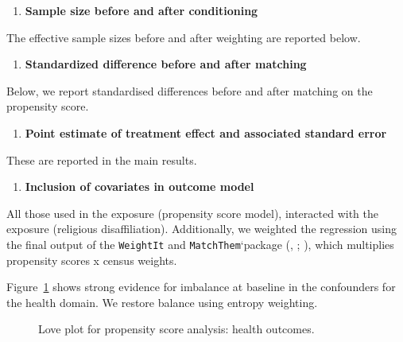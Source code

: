 \documentclass[
  singlecolumn,
  9pt]{article}
\providecommand{\tightlist}{%
  \setlength{\itemsep}{0pt}\setlength{\parskip}{0pt}}\usepackage{longtable,booktabs,array}
\begin{document}
\begin{enumerate}
\def\labelenumi{\arabic{enumi}.}
\setcounter{enumi}{7}
\tightlist
\item
  \textbf{Sample size before and after conditioning}
\end{enumerate}

The effective sample sizes before and after weighting are reported
below.

\begin{enumerate}
\def\labelenumi{\arabic{enumi}.}
\setcounter{enumi}{8}
\tightlist
\item
  \textbf{Standardized difference before and after matching}
\end{enumerate}

Below, we report standardised differences before and after matching on
the propensity score.

\begin{enumerate}
\def\labelenumi{\arabic{enumi}.}
\setcounter{enumi}{9}
\tightlist
\item
  \textbf{Point estimate of treatment effect and associated standard
  error}
\end{enumerate}

These are reported in the main results.

\begin{enumerate}
\def\labelenumi{\arabic{enumi}.}
\setcounter{enumi}{10}
\tightlist
\item
  \textbf{Inclusion of covariates in outcome model}
\end{enumerate}

All those used in the exposure (propensity score model), interacted with
the exposure (religious disaffiliation). Additionally, we weighted the
regression using the final output of the \texttt{WeightIt} and
\texttt{MatchThem}`package (,
; ), which multiplies propensity scores x census
weights.

Figure~\ref{fig-results-health-propensity-scores} shows strong evidence
for imbalance at baseline in the confounders for the health domain. We
restore balance using entropy weighting.

\begin{figure}


\caption{\label{fig-results-health-propensity-scores}Love plot for
propensity score analysis: health outcomes.}

\end{figure}%
\end{document}
